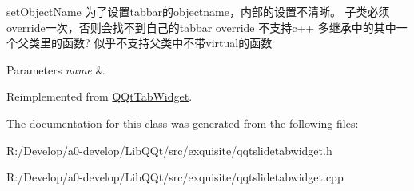 set\+Object\+Name 为了设置tabbar的objectname，内部的设置不清晰。 子类必须override一次，否则会找不到自己的tabbar override 不支持c++ 多继承中的其中一个父类里的函数? 似乎不支持父类中不带virtual的函数 


\begin{DoxyParams}{Parameters}
{\em name} & \\
\hline
\end{DoxyParams}


Reimplemented from \mbox{\hyperlink{class_q_qt_tab_widget_a45cec441f1ceb658d628a23c110359f3}{Q\+Qt\+Tab\+Widget}}.



The documentation for this class was generated from the following files\+:\begin{DoxyCompactItemize}
\item 
R\+:/\+Develop/a0-\/develop/\+Lib\+Q\+Qt/src/exquisite/qqtslidetabwidget.\+h\item 
R\+:/\+Develop/a0-\/develop/\+Lib\+Q\+Qt/src/exquisite/qqtslidetabwidget.\+cpp\end{DoxyCompactItemize}
